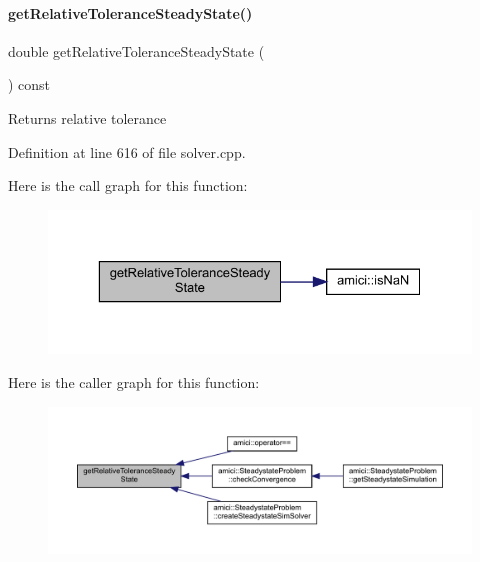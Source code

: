 \paragraph{\texorpdfstring{get\+Relative\+Tolerance\+Steady\+State()}{getRelativeToleranceSteadyState()}}
{\footnotesize\ttfamily double get\+Relative\+Tolerance\+Steady\+State (\begin{DoxyParamCaption}{ }\end{DoxyParamCaption}) const}

\begin{DoxyReturn}{Returns}
relative tolerance 
\end{DoxyReturn}


Definition at line 616 of file solver.\+cpp.

Here is the call graph for this function\+:
\nopagebreak
\begin{figure}[H]
\begin{center}
\leavevmode
\includegraphics[width=329pt]{classamici_1_1_solver_ae598de1a48d3c4af1d08b8436d481e11_cgraph}
\end{center}
\end{figure}
Here is the caller graph for this function\+:
\nopagebreak
\begin{figure}[H]
\begin{center}
\leavevmode
\includegraphics[width=350pt]{classamici_1_1_solver_ae598de1a48d3c4af1d08b8436d481e11_icgraph}
\end{center}
\end{figure}
\mbox{\label{classamici_1_1_solver_abdc290e52ae8a037aa65648f044c1ab5}} 

